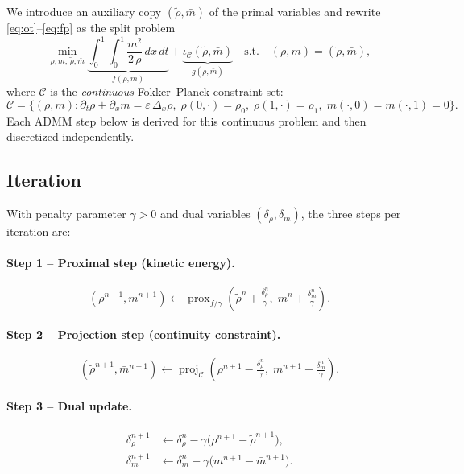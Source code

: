 \documentclass[11pt]{article}
\newcommand{\dx}{\,dx}
\newcommand{\dt}{\,dt}
\newcommand{\rhoO}{\rho_0}
\newcommand{\rhoT}{\rho_1}
\newcommand{\Dx}{\Delta_x}          %
\DeclareMathOperator{\prox}{prox}
\DeclareMathOperator{\proj}{proj}
\begin{document}
We introduce an auxiliary copy $(\tilde\rho, \bar{m})$ of the primal
variables and rewrite \eqref{eq:ot}--\eqref{eq:fp} as the split problem
%
\begin{equation}
  \min_{\rho,m,\,\tilde\rho,\bar m}
  \underbrace{\int_0^1\!\int_0^1 \frac{m^2}{2\,\rho}\dx\dt}_{f(\rho,m)}
  + \underbrace{\iota_{\mathcal{C}}(\tilde\rho,\bar m)}_{g(\tilde\rho,\bar m)}
  \quad\text{s.t.}\quad
  (\rho,m)=(\tilde\rho,\bar m),
\end{equation}
%
where $\mathcal{C}$ is the \emph{continuous} Fokker--Planck constraint set:
\begin{equation*}
  \mathcal{C} = \bigl\{(\rho,m) :
    \partial_t\rho + \partial_x m = \varepsilon\,\Dx\rho,\;
    \rho(0,\cdot)=\rhoO,\;
    \rho(1,\cdot)=\rhoT,\;
    m(\cdot,0)=m(\cdot,1)=0
  \bigr\}.
\end{equation*}
Each ADMM step below is derived for this continuous problem and then
discretized independently.

\subsection{Iteration}

With penalty parameter $\gamma>0$ and dual variables $(\delta_\rho,\delta_m)$,
the three steps per iteration are:

\paragraph{Step 1 -- Proximal step (kinetic energy).}
\begin{equation}\label{eq:prox}
  (\rho^{n+1},m^{n+1}) \leftarrow
  \prox_{f/\gamma}\!\left(
    \tilde\rho^n + \tfrac{\delta_\rho^n}{\gamma},\;
    \bar m^n + \tfrac{\delta_m^n}{\gamma}
  \right).
\end{equation}

\paragraph{Step 2 -- Projection step (continuity constraint).}
\begin{equation}\label{eq:proj}
  (\tilde\rho^{n+1},\bar m^{n+1}) \leftarrow
  \proj_{\mathcal{C}}\!\left(
    \rho^{n+1} - \tfrac{\delta_\rho^n}{\gamma},\;
    m^{n+1}   - \tfrac{\delta_m^n}{\gamma}
  \right).
\end{equation}

\paragraph{Step 3 -- Dual update.}
\begin{align}
  \delta_\rho^{n+1} &\leftarrow \delta_\rho^n
    - \gamma\bigl(\rho^{n+1} - \tilde\rho^{n+1}\bigr),\\
  \delta_m^{n+1}    &\leftarrow \delta_m^n
    - \gamma\bigl(m^{n+1} - \bar m^{n+1}\bigr).
\end{align}
\end{document}
